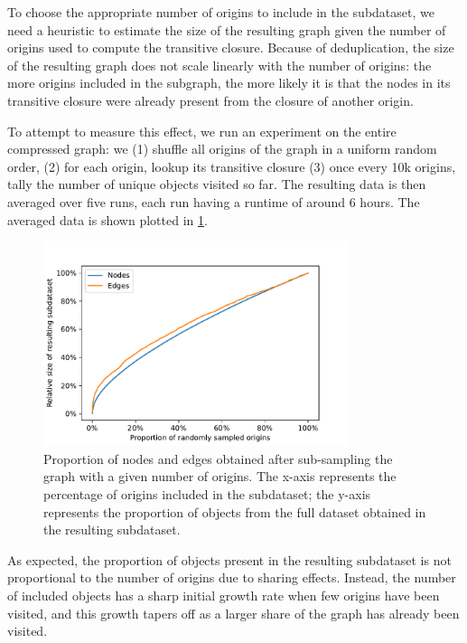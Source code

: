 To choose the appropriate number of origins to include in the subdataset, we
need a heuristic to estimate the size of the resulting graph given the number
of origins used to compute the transitive closure. Because of deduplication,
the size of the resulting graph does not scale linearly with the number of
origins: the more origins included in the subgraph, the more likely it is that
the nodes in its transitive closure were already present from the closure of
another origin.

To attempt to measure this effect, we run an experiment on the entire
compressed graph: we (1) shuffle all origins of the graph in a uniform
random order, (2) for each origin, lookup its transitive closure (3) once every
10k origins, tally the number of unique objects visited so far. The resulting
data is then averaged over five runs, each run having a runtime of around 6
hours.  The averaged data is shown plotted in
\cref{fig:subdataset-size-function}.

\begin{figure}
    \centering
    \includegraphics[width=0.8\textwidth]{img/graph-exploitation/subdataset_size_function}
    \caption{Proportion of nodes and edges obtained after sub-sampling the
        graph with a given number of origins. The x-axis represents the
        percentage of origins included in the subdataset; the y-axis represents
        the proportion of objects from the full dataset obtained in the
    resulting subdataset.}%
    \label{fig:subdataset-size-function}
\end{figure}

As expected, the proportion of objects present in the resulting subdataset is
not proportional to the number of origins due to sharing effects. Instead,
the number of included objects has a sharp initial growth rate when few origins
have been visited, and this growth tapers off as a larger share of the graph
has already been visited.

